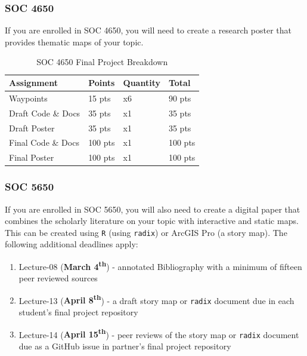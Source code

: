 \documentclass[]{book}
\providecommand{\tightlist}{%
  \setlength{\itemsep}{0pt}\setlength{\parskip}{0pt}}
\begin{document}
\hypertarget{soc-4650}{%
\subsubsection{SOC 4650}\label{soc-4650}}

If you are enrolled in SOC 4650, you will need to create a research poster that provides thematic maps of your topic.

\begin{table}

\caption{\label{tab:unnamed-chunk-5}SOC 4650 Final Project Breakdown}
\centering
\begin{tabular}[t]{llll}
\toprule
Assignment & Points & Quantity & Total\\
\midrule
Waypoints & 15 pts & x6 & 90 pts\\
Draft Code \& Docs & 35 pts & x1 & 35 pts\\
Draft Poster & 35 pts & x1 & 35 pts\\
Final Code \& Docs & 100 pts & x1 & 100 pts\\
Final Poster & 100 pts & x1 & 100 pts\\
\bottomrule
\end{tabular}
\end{table}

\hypertarget{soc-5650}{%
\subsubsection{SOC 5650}\label{soc-5650}}

If you are enrolled in SOC 5650, you will also need to create a digital paper that combines the scholarly literature on your topic with interactive and static maps. This can be created using \texttt{R} (using \texttt{radix}) or ArcGIS Pro (a story map). The following additional deadlines apply:

\begin{enumerate}
\def\labelenumi{\arabic{enumi}.}
\tightlist
\item
  Lecture-08 (\textbf{March 4\textsuperscript{th}}) - annotated Bibliography with a minimum of fifteen peer reviewed sources
\item
  Lecture-13 (\textbf{April 8\textsuperscript{th}}) - a draft story map or \texttt{radix} document due in each student's final project repository
\item
  Lecture-14 (\textbf{April 15\textsuperscript{th}}) - peer reviews of the story map or \texttt{radix} document due as a GitHub issue in partner's final project repository
\end{enumerate}
\end{document}
